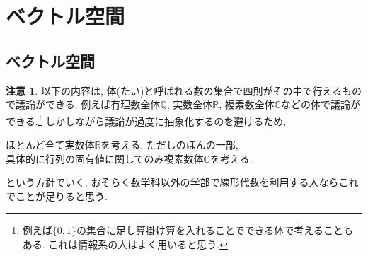 \documentclass[dvipdfmx,a4paper,11pt]{article} %
\newcommand{\R}{\mathbb{R}}
\newcommand{\Q}{\mathbb{Q}}
\newcommand{\C}{\mathbb{C}}
\newcommand{\xr}[1]{\textcolor{red}{#1}}
\theoremstyle{definition}
\newtheorem{cau}[thm]{注意}
\begin{document}





\section{ベクトル空間  \cite[4章]{M}}

\subsection{ベクトル空間 \cite[4.1節]{M}}

\begin{cau}
以下\cite[4章]{M}の内容は, 体(たい)と呼ばれる数の集合で四則がその中で行えるもので議論ができる. 
例えば有理数全体$\Q$, 実数全体$\R$, 複素数全体$\C$などの体で議論ができる.\footnote{例えば$\{0, 1\}$の集合に足し算掛け算を入れることでできる体で考えることもある. これは情報系の人はよく用いると思う.} 
しかしながら議論が過度に抽象化するのを避けるため,
\begin{tcolorbox}[mybox]
\begin{center}
ほとんど全て実数体$\R$を考える. 
ただし\cite[5章]{M}のほんの一部, \\ 具体的に行列の固有値に関してのみ複素数体$\C$を考える.
\end{center}
\end{tcolorbox}
という方針でいく. おそらく数学科以外の学部で線形代数を利用する人ならこれでことが足りると思う.
\end{cau}
\end{document}
